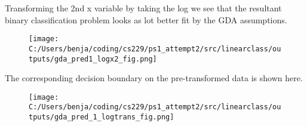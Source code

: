 %
%
\begin{answer}
Transforming the 2nd x variable by taking the log we see that the resultant binary classification problem looks as lot better fit by the GDA assumptions.
\begin{figure}[H]
\texttt{[image: C:/Users/benja/coding/cs229/ps1\_attempt2/src/linearclass/outputs/gda\_pred1\_logx2\_fig.png]}
\end{figure}

The corresponding decision boundary on the pre-transformed data is shown here.

\begin{figure}[H]
\texttt{[image: C:/Users/benja/coding/cs229/ps1\_attempt2/src/linearclass/outputs/gda\_pred\_1\_logtrans\_fig.png]}
\end{figure}
\end{answer}
%
